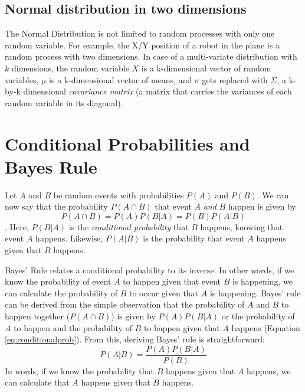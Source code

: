 \subsection{Normal distribution in two dimensions}
The Normal Distribution is not limited to random processes with only one random variable. For example, the X/Y position of a robot in the plane is a random process with two dimensions. In case of a multi-variate distribution with $k$ dimensions, the random variable $ X$ is a k-dimensional vector of random variables, $ \mu$ is a k-dimensional vector of means, and $ \sigma$ gets replaced with $ \Sigma$,  a k-by-k dimensional \emph{covariance matrix} (a matrix that carries the variances of each random variable in its diagonal).

\section{Conditional Probabilities and Bayes Rule}\label{sec:bayesrule}
Let $A$ and $B$ be random events with probabilities $P(A)$ and $P(B)$. We can now say that the probability $P(A \cap B)$ that event $A$ \emph{and} $B$ happen is given by
\begin{equation}\label{eq:conditionalprob}
P(A \cap B)=P(A)P(B|A)=P(B)P(A|B)
\end{equation}.
Here, $P(B|A)$ is the \emph{conditional probability} that $B$ happens, knowing that event $A$ happens. Likewise, $P(A|B)$ is the probability that event $A$ happens given that $B$ happens.

Bayes' Rule relates a conditional probability to its inverse. In other words, if we know the probability of event $A$ to happen given that event $B$ is happening, we can calculate the probability of $B$ to occur given that $A$ is happening. Bayes' rule can be derived from the simple observation that the probability of $A$ and $B$ to happen together ($P(A \cap B)$) is given by $P(A)P(B|A)$ or the probability of $A$ to happen and the probability of $B$ to happen given that $A$ happens (Equation \ref{eq:conditionalprob}). 
From this, deriving Bayes' rule is straightforward:
\begin{equation}
P(A|B)=\frac{P(A)P(B|A)}{P(B)}
\end{equation}
In words, if we know the probability that $B$ happens given that $A$ happens, we can calculate that $A$ happens given that $B$ happens. 

